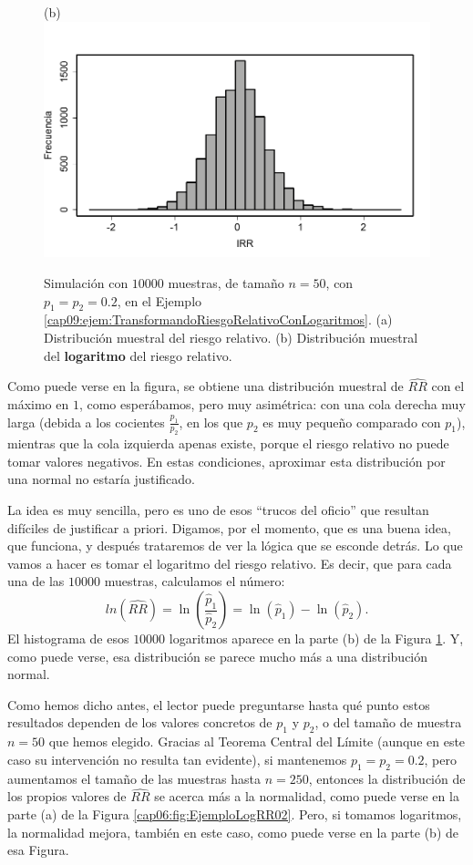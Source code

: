 \begin{ejemplo}
\begin{figure}[p]
\begin{center}
\begin{bn}
(b)\\[3mm]
\includegraphics[width=13cm]{../fig/Cap09-EjemploLogRR02-bn.png}
\end{bn}
\caption{Simulación con $10000$ muestras, de tamaño $n=50$, con $p_1=p_2=0.2$, en el Ejemplo \ref{cap09:ejem:TransformandoRiesgoRelativoConLogaritmos}. (a) Distribución muestral  del riesgo relativo. (b) Distribución muestral del {\bf logaritmo} del riesgo relativo.}
\label{cap06:fig:EjemploLogRR01}
\end{center}
\end{figure}

Como puede verse en la figura, se obtiene una distribución muestral de $\widehat{RR}$ con el máximo en $1$, como esperábamos, pero muy asimétrica: con una cola derecha muy larga (debida a los cocientes $\frac{p_1}{p_2}$, en los que $p_2$ es muy pequeño comparado con $p_1$), mientras que la cola izquierda apenas existe, porque el riesgo relativo no puede tomar valores negativos. En estas condiciones, aproximar esta distribución por una normal no estaría justificado.

La idea es muy sencilla, pero es uno de esos ``trucos del oficio'' que resultan difíciles de justificar a priori. Digamos, por el momento, que es una buena idea, que funciona, y después trataremos de ver la lógica que se esconde detrás. Lo que vamos a hacer es tomar el logaritmo del riesgo relativo. Es decir, que para cada una de las $10000$ muestras, calculamos el número:
\[ln(\widehat{RR})=\ln\left(\dfrac{\hat p_1}{\hat p_2}\right)=\ln(\hat p_1)-\ln(\hat p_2).\]
El histograma de esos $10000$ logaritmos aparece en la parte (b) de la Figura \ref{cap06:fig:EjemploLogRR01}. Y, como puede verse, esa distribución se parece mucho más a una distribución normal.

Como hemos dicho antes, el lector puede preguntarse hasta qué punto estos resultados dependen de los valores concretos de $p_1$ y $p_2$, o del tamaño de muestra $n=50$ que hemos elegido. Gracias al Teorema Central del Límite (aunque en este caso su intervención no resulta tan evidente), si mantenemos $p_1=p_2=0.2$, pero aumentamos el tamaño de las muestras hasta $n=250$, entonces la distribución de los propios valores de $\widehat{RR}$ se acerca más a la normalidad, como puede verse en la parte (a) de la Figura \ref{cap06:fig:EjemploLogRR02}. Pero, si tomamos logaritmos, la normalidad mejora, también en este caso, como puede verse en la parte (b) de esa Figura.


\end{ejemplo}
